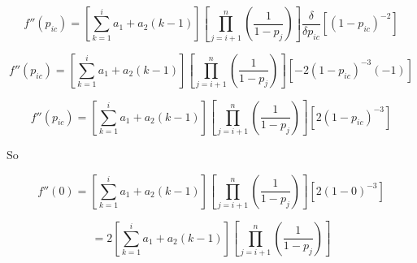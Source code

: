 \documentclass[11pt]{article} %
\begin{document}
$$f''(p_{ic})=
\left[\sum_{k=1}^{i} a_1 + a_2(k-1)\right]
\left[\prod_{j=i+1}^{n}(\frac{1}{1-p_{j}})\right]
\frac{\delta}{\delta p_{ic}}
\left[
(1-p_{ic})^{-2}
\right]
$$

$$f''(p_{ic})=
\left[\sum_{k=1}^{i} a_1 + a_2(k-1)\right]
\left[\prod_{j=i+1}^{n}(\frac{1}{1-p_{j}})\right]
\left[
-2 (1-p_{ic})^{-3} (-1)
\right]
$$

$$f''(p_{ic})=
\left[\sum_{k=1}^{i} a_1 + a_2(k-1)\right]
\left[\prod_{j=i+1}^{n}(\frac{1}{1-p_{j}})\right]
\left[
2 (1-p_{ic})^{-3}
\right]
$$

So

$$f''(0)=
\left[\sum_{k=1}^{i} a_1 + a_2(k-1)\right]
\left[\prod_{j=i+1}^{n}(\frac{1}{1-p_{j}})\right]
\left[
2 (1-0)^{-3}
\right]
$$

$$=
2
\left[\sum_{k=1}^{i} a_1 + a_2(k-1)\right]
\left[\prod_{j=i+1}^{n}(\frac{1}{1-p_{j}})\right]
$$
\end{document}
